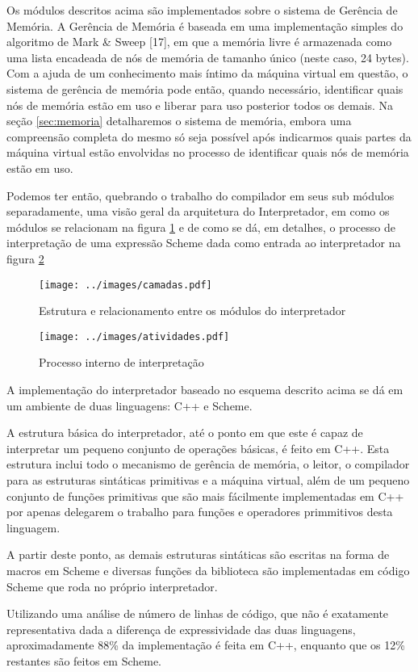 Os módulos descritos acima são implementados sobre o sistema de Gerência de
Memória. A Gerência de Memória é baseada em uma implementação simples do
algoritmo de Mark \& Sweep [17], em que a memória livre é armazenada como uma
lista encadeada de nós de memória de tamanho único (neste caso, 24 bytes). Com
a ajuda de um conhecimento mais íntimo da máquina virtual em questão, o sistema
de gerência de memória pode então, quando necessário, identificar quais nós de
memória estão em uso e liberar para uso posterior todos os demais. Na seção
\ref{sec:memoria} detalharemos o sistema de memória, embora uma compreensão
completa do mesmo só seja possível após indicarmos quais partes da máquina
virtual estão envolvidas no processo de identificar quais nós de memória estão
em uso.

Podemos ter então, quebrando o trabalho do compilador em seus sub módulos
separadamente, uma visão geral da arquitetura do Interpretador, em como os
módulos se relacionam na figura \ref{fig:camadas} e de como se dá, em detalhes, o
processo de interpretação de uma expressão Scheme dada como entrada ao
interpretador na figura \ref{fig:atividades}

\begin{figure}[h!]
\centering
\texttt{[image: ../images/camadas.pdf]}
\caption{Estrutura e relacionamento entre os módulos do interpretador}
\label{fig:camadas}
\end{figure}

\begin{figure}[h!]
\centering
\texttt{[image: ../images/atividades.pdf]}
\caption{Processo interno de interpretação}
\label{fig:atividades}
\end{figure}

A implementação do interpretador baseado no esquema descrito acima se dá em um
ambiente de duas linguagens: C++ e Scheme.

A estrutura básica do interpretador, até o ponto em que este é capaz de
interpretar um pequeno conjunto de operações básicas, é feito em C++. Esta
estrutura inclui todo o mecanismo de gerência de memória, o leitor, o
compilador para as estruturas sintáticas primitivas e a máquina virtual, além
de um pequeno conjunto de funções primitivas que são mais fácilmente
implementadas em C++ por apenas delegarem o trabalho para funções e operadores
primmitivos desta linguagem.

A partir deste ponto, as demais estruturas sintáticas são escritas na forma de
macros em Scheme e diversas funções da biblioteca são implementadas em código
Scheme que roda no próprio interpretador. 

Utilizando uma análise de número de linhas de código, que não é exatamente
representativa dada a diferença de expressividade das duas linguagens,
aproximadamente 88\% da implementação é feita em C++, enquanto que os 12\%
restantes são feitos em Scheme.



